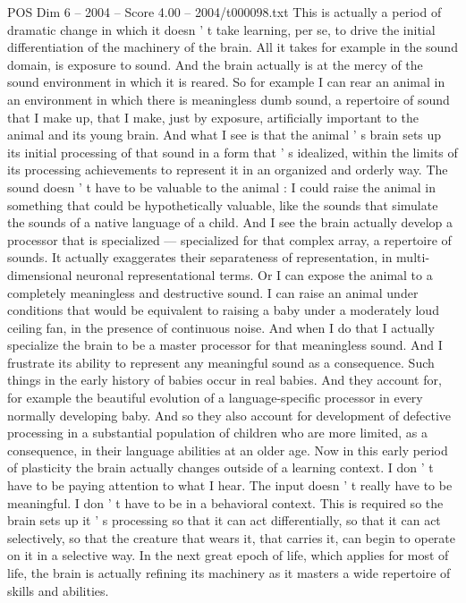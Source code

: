 \begin{textsample}{POS Dim 6 – 2004 – Score 4.00 – 2004/t000098.txt}
This is actually a period of dramatic change in which it doesn ' t take learning, per se, to drive the initial differentiation of the machinery of the brain.
All it takes for example in the sound domain, is exposure to sound.
And the brain actually is at the mercy of the sound environment in which it is reared.
So for example I can rear an animal in an environment in which there is meaningless dumb sound, a repertoire of sound that I make up, that I make, just by exposure, artificially important to the animal and its young brain.
And what I see is that the animal ' s brain sets up its initial processing of that sound in a form that ' s idealized, within the limits of its processing achievements to represent it in an organized and orderly way.
The sound doesn ' t have to be valuable to the animal : I could raise the animal in something that could be hypothetically valuable, like the sounds that simulate the sounds of a native language of a child.
And I see the brain actually develop a processor that is specialized — specialized for that complex array, a repertoire of sounds.
It actually exaggerates their separateness of representation, in multi-dimensional neuronal representational terms.
Or I can expose the animal to a completely meaningless and destructive sound.
I can raise an animal under conditions that would be equivalent to raising a baby under a moderately loud ceiling fan, in the presence of continuous noise.
And when I do that I actually specialize the brain to be a master processor for that meaningless sound.
And I frustrate its ability to represent any meaningful sound as a consequence.
Such things in the early history of babies occur in real babies.
And they account for, for example the beautiful evolution of a language-specific processor in every normally developing baby.
And so they also account for development of defective processing in a substantial population of children who are more limited, as a consequence, in their language abilities at an older age.
Now in this early period of plasticity the brain actually changes outside of a learning context.
I don ' t have to be paying attention to what I hear.
The input doesn ' t really have to be meaningful.
I don ' t have to be in a behavioral context.
This is required so the brain sets up it ' s processing so that it can act differentially, so that it can act selectively, so that the creature that wears it, that carries it, can begin to operate on it in a selective way.
In the next great epoch of life, which applies for most of life, the brain is actually refining its machinery as it masters a wide repertoire of skills and abilities.

\end{textsample}
